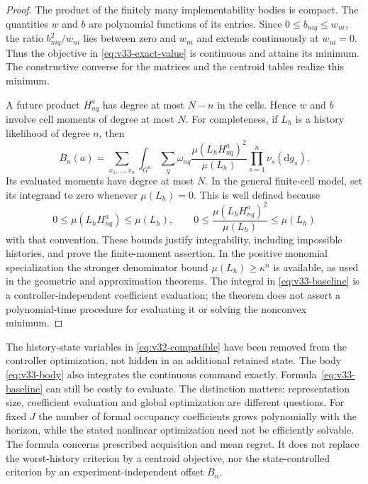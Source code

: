 \begin{proof}
The product of the finitely many implementability bodies is compact.
The quantities $w$ and $b$ are polynomial functions of its entries.
Since $0\le b_{niq}\le w_{ni}$, the ratio $b_{niq}^2/w_{ni}$ lies
between zero and $w_{ni}$ and extends continuously at $w_{ni}=0$.
Thus the objective in \eqref{eq:v33-exact-value} is continuous and
attains its minimum. The constructive converse for the matrices and
the centroid tables realize this minimum.

A future product $H^a_{nq}$ has degree at most $N-n$ in the cells. Hence $w$
and $b$ involve cell moments of degree at most $N$. For completeness,
if $L_h$ is a history likelihood of degree $n$, then
\begin{equation}\label{eq:v33-baseline}
 B_n(a)=\sum_{x_1,\ldots,x_n}\int_{G^n}\sum_q\omega_{nq}
       \frac{\mu(L_hH^a_{nq})^2}{\mu(L_h)}
               \prod_{s=1}^n\nu_s(\mathrm dg_s).
\end{equation}
Its evaluated moments have degree at most $N$. In the general
finite-cell model, set its integrand to zero whenever $\mu(L_h)=0$.
This is well defined because
\[
 0\le\mu(L_hH^a_{nq})\le\mu(L_h),\qquad
 0\le\frac{\mu(L_hH^a_{nq})^2}{\mu(L_h)}\le\mu(L_h)
\]
with that convention. These bounds justify integrability, including
impossible histories, and prove the finite-moment assertion. In the
positive monomial specialization the stronger denominator bound
$\mu(L_h)\ge\kappa^n$ is available, as used in the geometric and
approximation theorems.
The integral in \eqref{eq:v33-baseline} is a controller-independent
coefficient evaluation; the theorem does not assert a polynomial-time
procedure for evaluating it or solving the nonconvex minimum.
\end{proof}

\begin{remark}\label{rem:v33-tree}
The history-state variables in \eqref{eq:v32-compatible} have been
removed from the controller optimization, not hidden in an additional
retained state. The body \eqref{eq:v33-body} also integrates the
continuous command exactly. Formula~\eqref{eq:v33-baseline} can still
be costly to evaluate. The distinction matters: representation size,
coefficient evaluation and global optimization are different questions.
For fixed $J$ the number of formal occupancy coefficients grows
polynomially with the horizon, while the stated nonlinear optimization
need not be efficiently solvable. The formula concerns prescribed
acquisition and mean regret. It does not replace the worst-history
criterion by a centroid objective, nor the state-controlled criterion
by an experiment-independent offset $B_n$.
\end{remark}

